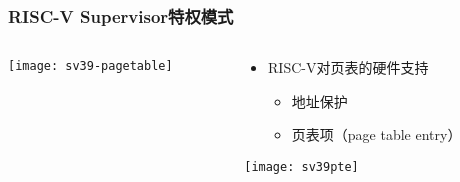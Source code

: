 \begin{frame}   
	\frametitle{RISC-V Supervisor特权模式}
	
	\begin{columns}[t]
		
		\begin{column}{.5\textwidth}
			
			\texttt{[image: sv39-pagetable]}
			
		\end{column}
		
		
		\begin{column}{.5\textwidth}
			
			\begin{itemize}\large
				\item RISC-V对页表的硬件支持
				\begin{itemize}
					\item 地址保护
					\item 页表项（page table entry）
					
					
				\end{itemize}
			\end{itemize}
			\texttt{[image: sv39pte]}

		\end{column}
		
		
	\end{columns}
	
\end{frame}



